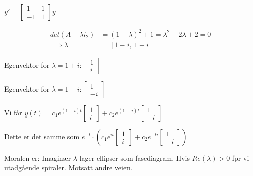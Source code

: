 \documentclass[11pt, a4paper, norsk]{article}
\begin{document}
            \begin{Example}{}{}
                $\underline{y'} = \begin{bmatrix}
                        1 & 1 \\
                        -1 & 1
                \end{bmatrix}\underline{y}$

                \begin{align*}
                    det(A - \lambda i_2) &= (1-\lambda)^2 + 1 = \lambda^2 - 2\lambda + 2 = 0
                    \\
                    \implies \lambda &= \left[ 1 - i, \  1 + i\right]
                \end{align*}

                Egenvektor for $\lambda = 1+i: \begin{bmatrix}
                    1 \\
                    i
                \end{bmatrix}$

                Egenvektor for $\lambda = 1-i: \begin{bmatrix}
                    1 \\
                    -i
                \end{bmatrix}$

                Vi får $\underline{y}(t) = c_1 e^{(1+i)t} \begin{bmatrix}
                    1\\
                    i
                \end{bmatrix} + c_2 e^{(1-i)t}\begin{bmatrix}
                    1 \\
                    -i
                \end{bmatrix}$
                
                Dette er det samme som $e^{-t} \cdot \left(c_1 e^{it}\begin{bmatrix}
                    1 \\
                    i
                \end{bmatrix} + c_2e^{-ti}\begin{bmatrix}
                    1 \\
                    -i
                \end{bmatrix}\right)$
                
                Moralen er: Imaginær $\lambda$ lager ellipser som fasediagram. Hvis $Re(\lambda) > 0 $ fpr vi utadgående spiraler. Motsatt andre veien. 

            \end{Example}
\end{document}
